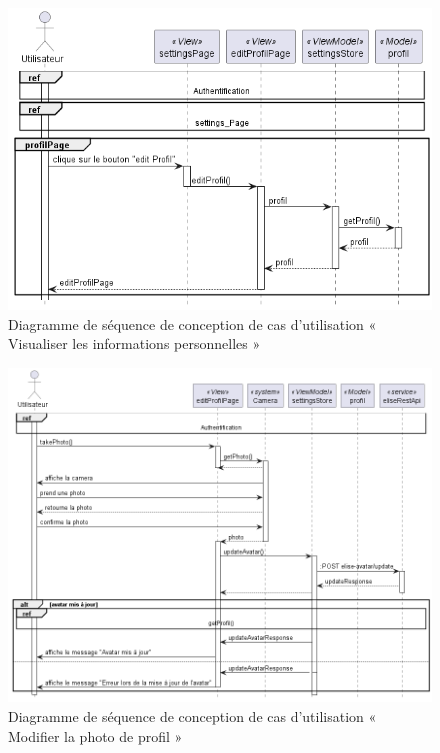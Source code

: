 \begin{figure}[H]
  \centering
  \includegraphics[width=1\textwidth]{out/diagrams/sprint6/sequence_visualiser_profil/sequence_visualiser_profil}
  \caption{Diagramme de séquence de conception de cas d'utilisation «  Visualiser les informations personnelles »}
  \label{fig:conception_sequence_visualiser_profil}
\end{figure}

\begin{figure}[H]
  \centering
  \includegraphics[width=1\textwidth]{out/diagrams/sprint6/sequence_edit_profil_avatar/sequence_edit_profil_avatar}
  \caption{Diagramme de séquence de conception de cas d'utilisation «  Modifier la photo de profil »}
  \label{fig:conception_sequence_edit_profil_avatar}
\end{figure}

